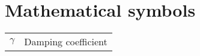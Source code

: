 \section*{Mathematical symbols}
\begin{tabular}{p{}p{}}
   $\gamma$ & Damping coefficient \\[0.2cm]
\end{tabular}
